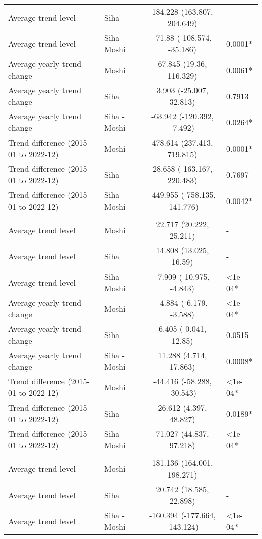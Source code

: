 \begin{longtable}{l|lcl}
Average trend level & Siha & 184.228 (163.807, 204.649) & - \\ 
Average trend level & Siha - Moshi & -71.88 (-108.574, -35.186) & 0.0001* \\ 
Average yearly trend change & Moshi & 67.845 (19.36, 116.329) & 0.0061* \\ 
Average yearly trend change & Siha & 3.903 (-25.007, 32.813) & 0.7913 \\ 
Average yearly trend change & Siha - Moshi & -63.942 (-120.392, -7.492) & 0.0264* \\ 
Trend difference (2015-01 to 2022-12) & Moshi & 478.614 (237.413, 719.815) & 0.0001* \\ 
Trend difference (2015-01 to 2022-12) & Siha & 28.658 (-163.167, 220.483) & 0.7697 \\ 
Trend difference (2015-01 to 2022-12) & Siha - Moshi & -449.955 (-758.135, -141.776) & 0.0042* \\ 
\midrule\addlinespace[2.5pt]
\multicolumn{4}{l}{Poisoning} \\[2.5pt] 
\midrule\addlinespace[2.5pt]
Average trend level & Moshi & 22.717 (20.222, 25.211) & - \\ 
Average trend level & Siha & 14.808 (13.025, 16.59) & - \\ 
Average trend level & Siha - Moshi & -7.909 (-10.975, -4.843) & <1e-04* \\ 
Average yearly trend change & Moshi & -4.884 (-6.179, -3.588) & <1e-04* \\ 
Average yearly trend change & Siha & 6.405 (-0.041, 12.85) & 0.0515 \\ 
Average yearly trend change & Siha - Moshi & 11.288 (4.714, 17.863) & 0.0008* \\ 
Trend difference (2015-01 to 2022-12) & Moshi & -44.416 (-58.288, -30.543) & <1e-04* \\ 
Trend difference (2015-01 to 2022-12) & Siha & 26.612 (4.397, 48.827) & 0.0189* \\ 
Trend difference (2015-01 to 2022-12) & Siha - Moshi & 71.027 (44.837, 97.218) & <1e-04* \\ 
\midrule\addlinespace[2.5pt]
\multicolumn{4}{l}{Psychoses} \\[2.5pt] 
\midrule\addlinespace[2.5pt]
Average trend level & Moshi & 181.136 (164.001, 198.271) & - \\ 
Average trend level & Siha & 20.742 (18.585, 22.898) & - \\ 
Average trend level & Siha - Moshi & -160.394 (-177.664, -143.124) & <1e-04* \\ 

\end{longtable}
